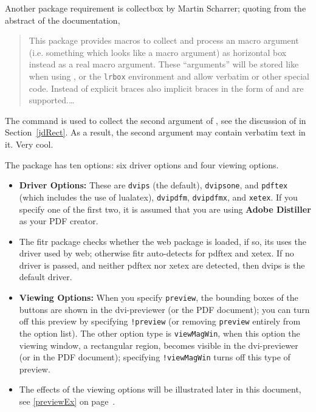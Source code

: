 \documentclass{article}
\begin{document}
Another package requirement is \textsf{collectbox} by Martin Scharrer;
quoting from the abstract of the documentation,
\begin{quote}
This package provides macros to collect and process an macro argument
(i.e. something which looks like a macro argument) as horizontal box
instead as a real macro argument. These ``arguments'' will be stored like
when using ,  or the \texttt{lrbox} environment and
allow verbatim or other special code. Instead of explicit braces also
implicit braces in the form of  and  are supported.\dots
\end{quote}
The  command is used to collect the second argument of
, see the discussion of  in Section~\ref*{jdRect}.
As a result, the second argument may contain verbatim text in it. Very cool.

The package has ten options: six driver options and four viewing
options.
\begin{itemize}
\item \textbf{Driver Options:} These are \texttt{dvips} (the default),
    \texttt{dvipsone}, and \texttt{pdftex} (which includes the use of
    lualatex), \texttt{dvipdfm}, \texttt{dvipdfmx}, and \texttt{xetex}. If you
    specify one of the first two, it is assumed that you are using
    \textbf{Adobe Distiller} as your PDF creator.

\item[] The \textsf{fitr} package checks whether the \textsf{web}
    package is loaded, if so, its uses the driver used by
    \textsf{web}; otherwise \textsf{fitr} auto-detects for
    \textsf{pdftex} and \textsf{xetex}. If no driver is passed, and
    neither \textsf{pdftex} nor \textsf{xetex} are detected, then
    \textsf{dvips} is the default driver.

\item \textbf{Viewing Options:} When you specify \texttt{preview}, the
bounding boxes of the buttons are shown in the dvi-previewer (or the PDF
document); you can turn off this preview by specifying \texttt{!preview}
(or removing \texttt{preview} entirely from the option list). The other
option type is \texttt{viewMagWin}, when this option the viewing window, a
rectangular region, becomes visible in the dvi-previewer (or in the PDF
document); specifying \texttt{!viewMagWin} turns off this type of preview.

\item[] The effects of the viewing options will be illustrated later in this
document, see \autoref{previewEx} on page~\pageref*{previewEx}.

\end{itemize}
\end{document}

